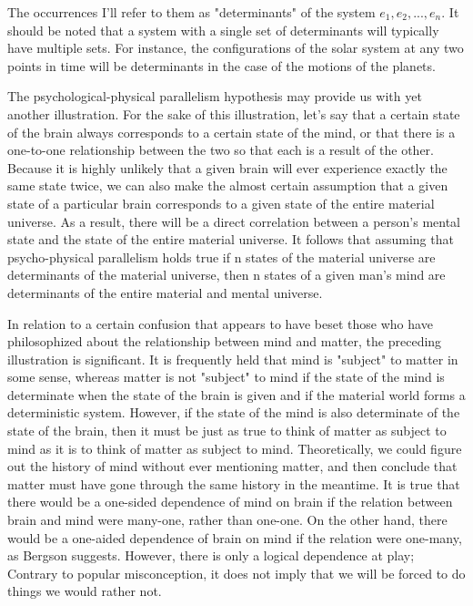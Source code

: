 \documentclass[a4paper,12pt]{book}[2004/02/16]
\theoremstyle{ilemma}
\theoremstyle{itheorem}
\theoremstyle{iother}
\theoremstyle{icorollary}
\theoremstyle{numcorollary}
\theoremstyle{idefinition}
\begin{document}
The occurrences I'll refer to them as "determinants" of the system $e_1, e_2,..., e_n$. It should be noted that a system with a single set of determinants will typically have multiple sets. For instance, the configurations of the solar system at any two points in time will be determinants in the case of the motions of the planets.

The psychological-physical parallelism hypothesis may provide us with yet another illustration. For the sake of this illustration, let's say that a certain state of the brain always corresponds to a certain state of the mind, or that there is a one-to-one relationship between the two so that each is a result of the other. Because it is highly unlikely that a given brain will ever experience exactly the same state twice, we can also make the almost certain assumption that a given state of a particular brain corresponds to a given state of the entire material universe. As a result, there will be a direct correlation between a person's mental state and the state of the entire material universe. It follows that assuming that psycho-physical parallelism holds true if n states of the material universe are determinants of the material universe, then n states of a given man's mind are determinants of the entire material and mental universe.

In relation to a certain confusion that appears to have beset those who have philosophized about the relationship between mind and matter, the preceding illustration is significant. It is frequently held that mind is "subject" to matter in some sense, whereas matter is not "subject" to mind if the state of the mind is determinate when the state of the brain is given and if the material world forms a deterministic system. However, if the state of the mind is also determinate of the state of the brain, then it must be just as true to think of matter as subject to mind as it is to think of matter as subject to mind. Theoretically, we could figure out the history of mind without ever mentioning matter, and then conclude that matter must have gone through the same history in the meantime. It is true that there would be a one-sided dependence of mind on brain if the relation between brain and mind were many-one, rather than one-one. On the other hand, there would be a one-aided dependence of brain on mind if the relation were one-many, as Bergson suggests. However, there is only a logical dependence at play; Contrary to popular misconception, it does not imply that we will be forced to do things we would rather not.
\end{document}
